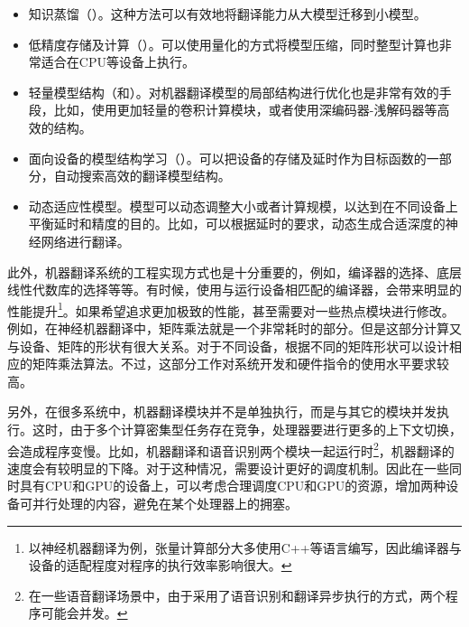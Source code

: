 \begin{itemize}
\vspace{0.5em}
\item 知识蒸馏（{\chapterthirteen}）。这种方法可以有效地将翻译能力从大模型迁移到小模型。

\vspace{0.5em}
\item 低精度存储及计算（{\chapterfourteen}）。可以使用量化的方式将模型压缩，同时整型计算也非常适合在CPU等设备上执行。

\vspace{0.5em}
\item 轻量模型结构（{\chapterfourteen}和{\chapterfifteen}）。对机器翻译模型的局部结构进行优化也是非常有效的手段，比如，使用更加轻量的卷积计算模块，或者使用深编码器-浅解码器等高效的结构。

\vspace{0.5em}
\item 面向设备的模型结构学习（{\chapterfifteen}）。可以把设备的存储及延时作为目标函数的一部分，自动搜索高效的翻译模型结构。

\vspace{0.5em}
\item 动态适应性模型。模型可以动态调整大小或者计算规模，以达到在不同设备上平衡延时和精度的目的。比如，可以根据延时的要求，动态生成合适深度的神经网络进行翻译。

\vspace{0.5em}
\end{itemize}

\parinterval 此外，机器翻译系统的工程实现方式也是十分重要的，例如，编译器的选择、底层线性代数库的选择等等。有时候，使用与运行设备相匹配的编译器，会带来明显的性能提升\footnote{以神经机器翻译为例，张量计算部分大多使用C++等语言编写，因此编译器与设备的适配程度对程序的执行效率影响很大。}。如果希望追求更加极致的性能，甚至需要对一些热点模块进行修改。例如，在神经机器翻译中，矩阵乘法就是一个非常耗时的部分。但是这部分计算又与设备、矩阵的形状有很大关系。对于不同设备，根据不同的矩阵形状可以设计相应的矩阵乘法算法。不过，这部分工作对系统开发和硬件指令的使用水平要求较高。

\parinterval 另外，在很多系统中，机器翻译模块并不是单独执行，而是与其它的模块并发执行。这时，由于多个计算密集型任务存在竞争，处理器要进行更多的上下文切换，会造成程序变慢。比如，机器翻译和语音识别两个模块一起运行时{\footnote{在一些语音翻译场景中，由于采用了语音识别和翻译异步执行的方式，两个程序可能会并发。}}，机器翻译的速度会有较明显的下降。对于这种情况，需要设计更好的调度机制。因此在一些同时具有CPU和GPU的设备上，可以考虑合理调度CPU和GPU的资源，增加两种设备可并行处理的内容，避免在某个处理器上的拥塞。

